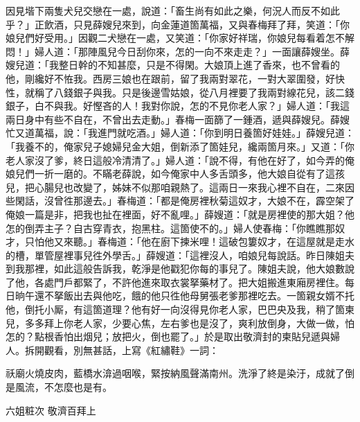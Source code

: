 因見堦下兩隻犬兒交戀在一處，說道：「畜生尚有如此之樂，何況人而反不如此乎？」正飲酒，只見薛嫂兒來到，向金蓮道箇萬福，又與春梅拜了拜，笑道：「你娘兒們好受用。」因觀二犬戀在一處，又笑道：「你家好祥瑞，你娘兒每看着怎不解悶！」婦人道：「那陣風兒今日刮你來，怎的一向不來走走？」一面讓薛嫂坐。薛嫂兒道：「我整日幹的不知甚麼，只是不得閑。大娘頂上進了香來，也不曾看的他，剛纔好不恠我。西房三娘也在跟前，留了我兩對翠花，一對大翠圍發，好快性，就稱了八錢銀子與我。只是後邊雪姑娘，從八月裡要了我兩對線花兒，該二錢銀子，白不與我。好慳吝的人！{}我對你說，怎的不見你老人家？」婦人道：「我這兩日身中有些不自在，不曾出去走動。」春梅一面篩了一鍾酒，遞與薛嫂兒。薛嫂忙又道萬福，說：「我進門就吃酒。」婦人道：「你到明日養箇好娃娃。」薛嫂兒道：「我養不的，俺家兒子媳婦兒金大姐，倒新添了箇娃兒，纔兩箇月來。」{}又道：「你老人家沒了爹，終日這般冷清清了。」婦人道：「說不得，有他在好了，如今弄的俺娘兒們一折一磨的。不瞞老薛說，如今俺家中人多舌頭多，他大娘自從有了這孩兒，把心腸兒也改變了，姊妹不似那咱親熱了。這兩日一來我心裡不自在，二來因些閑話，沒曾徃那邊去。」春梅道：「都是俺房裡秋菊這奴才，大娘不在，霹空架了俺娘一篇是非，把我也扯在裡面，好不亂哩。」{}薛嫂道：「就是房裡使的那大姐？他怎的倒弄主子？自古穿青衣，抱黑柱。這箇使不的。」婦人使春梅：「你瞧瞧那奴才，只怕他又來聽。」{}春梅道：「他在廚下揀米哩！這破包簍奴才，在這屋就是走水的槽，單管屋裡事兒徃外學舌。」薛嫂道：「這裡沒人，咱娘兒每說話。昨日陳姐夫到我那裡，如此這般告訴我，乾淨是他戳犯你每的事兒了。陳姐夫說，他大娘數說了他，各處門戶都緊了，不許他進來取衣裳拏藥材了。把大姐搬進東廂房裡住。每日晌午還不拏飯出去與他吃，餓的他只徃他母舅張老爹那裡吃去。一箇親女婿不托他，倒托小厮，有這箇道理？他有好一向沒得見你老人家，巴巴央及我，稍了箇柬兒，多多拜上你老人家，少要心焦，左右爹也是沒了，爽利放倒身，大做一做，怕怎的？{}點根香怕出烟兒；放把火，倒也罷了。」於是取出敬濟封的柬貼兒遞與婦人。拆開觀看，別無甚話，上寫《紅繡鞋》一詞：

\begin{myquote}
祅廟火燒皮肉，藍橋水渰過咽喉，緊按納風聲滿南州。洗淨了終是染汙，成就了倒是風流，不怎麼也是有。{}

六姐粧次 敬濟百拜上
\end{myquote}

